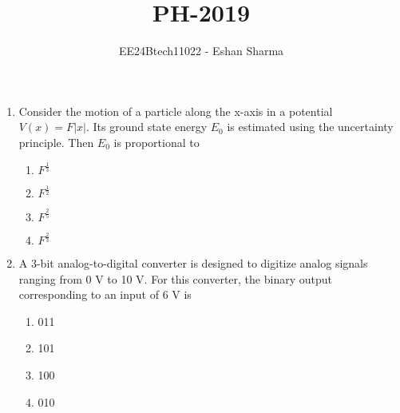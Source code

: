 \documentclass[journal,12pt,onecolumn]{IEEEtran}
\theoremstyle{remark}
\begin{document}

\vspace{3cm}

\title{PH-2019}
\author{EE24Btech11022 - Eshan Sharma}
\maketitle

\renewcommand{\thefigure}{\theenumi}
\renewcommand{\thetable}{\theenumi}



\begin{enumerate}
\item Consider the motion of a particle along the x-axis in a potential $V(x) = F|x|$. Its ground state energy $E_0$ is estimated using the uncertainty principle. Then $E_0$ is proportional to
\begin{multicols}{4}
	\begin{enumerate}
		\item $F^{\frac{1}{3}}$
		\item $F^{\frac{1}{2}}$
		\item $F^{\frac{2}{5}}$
		\item $F^{\frac{2}{3}}$
	\end{enumerate}
\end{multicols}

\item A 3-bit analog-to-digital converter is designed to digitize analog signals ranging from 0 V to 10 V. For this converter, the binary output corresponding to an input of 6 V is
\begin{multicols}{4}
	\begin{enumerate}
		\item 011
		\item 101
		\item 100
		\item 010
	\end{enumerate}
\end{multicols}


\end{enumerate}
\end{document}
